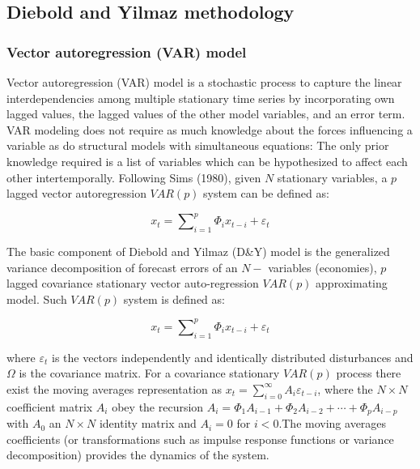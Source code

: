 \documentclass[]{elsarticle} %
\begin{document}
\subsection{\texorpdfstring{\textbf{Diebold and Yilmaz
methodology}}{Diebold and Yilmaz methodology}}\label{diebold-and-yilmaz-methodology}

\subsubsection{\texorpdfstring{\textbf{Vector autoregression (VAR)
model}}{Vector autoregression (VAR) model}}\label{vector-autoregression-var-model}

Vector autoregression (VAR) model is a stochastic process to capture the
linear interdependencies among multiple stationary time series by
incorporating own lagged values, the lagged values of the other model
variables, and an error term. VAR modeling does not require as much
knowledge about the forces influencing a variable as do structural
models with simultaneous equations: The only prior knowledge required is
a list of variables which can be hypothesized to affect each other
intertemporally. Following Sims (1980), given \(N\) stationary
variables, a \(p\) lagged vector autoregression \(VAR\left( p \right)\)
system can be defined as:

\[{{x}_{t}}=\sum\nolimits_{i=1}^{p}{{{\Phi }_{i}}{{x}_{t-i}}+{{\varepsilon }_{t}}}\]

The basic component of Diebold and Yilmaz (D\&Y) model is the
generalized variance decomposition of forecast errors of an \(N-\)
variables (economies), \(p\) lagged covariance stationary vector
auto-regression \(VAR\left( p \right)\) approximating model. Such
\(VAR\left( p \right)\) system is defined as:

\[{{x}_{t}}=\sum\nolimits_{i=1}^{p}{{{\Phi }_{i}}{{x}_{t-i}}+{{\varepsilon }_{t}}}\]

where \({{\varepsilon }_{t}}\) is the vectors independently and
identically distributed disturbances and \(\Omega\) is the covariance
matrix. For a covariance stationary \(VAR\left( p \right)\) process
there exist the moving averages representation as
\({{x}_{t}}=\sum\nolimits_{i=0}^{\infty }{{{A}_{i}}{{\varepsilon }_{t-i}}}\),
where the \(N\times N\) coefficient matrix \({{A}_{i}}\) obey the
recursion
\({{A}_{i}}={{\Phi }_{1}}{{A}_{i-1}}+{{\Phi }_{2}}{{A}_{i-2}}+\cdots +{{\Phi }_{p}}{{A}_{i-p}}\)
with \({{A}_{0}}\) an \(N\times N\) identity matrix and \({{A}_{i}}=0\)
for \(i<0\).The moving averages coefficients (or transformations such as
impulse response functions or variance decomposition) provides the
dynamics of the system.
\end{document}
